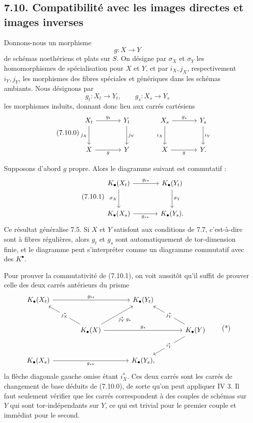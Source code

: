 \documentclass[11pt]{article}
\begin{document}
\subsection*{7.10. Compatibilité avec les images directes et images inverses}
Donnons-nous un morphisme
\[
  g:X\longrightarrow Y
\]
de schémas noethériens et plats sur \(S\). On désigne par \(\sigma_X\) et \(\sigma_Y\) les homomorphismes de spécialisation pour \(X\) et \(Y\), et par \(i_X,j_X\), respectivement \(i_Y,j_Y\), les morphismes des fibres spéciales et génériques dans les schémas ambiants. Nous désignons par
\[
  g_t:X_t\to Y_t,\qquad g_s:X_s\to Y_s
\]
les morphismes induits, donnant donc lieu aux carrés cartésiens
\begin{equation}\tag{7.10.0}
\begin{tikzcd}[column sep=large,row sep=large]
X_t \arrow[r,"g_t"] \arrow[d,"j_X"'] & Y_t \arrow[d,"j_Y"] &
X_s \arrow[r,"g_s"] \arrow[d,"i_X"'] & Y_s \arrow[d,"i_Y"]\\
X \arrow[r,"g"'] & Y &
X \arrow[r,"g"'] & Y .
\end{tikzcd}
\end{equation}

Supposons d'abord \(g\) propre. Alors le diagramme suivant est commutatif :
\begin{equation}\tag{7.10.1}
\begin{tikzcd}[column sep=large,row sep=large]
K_\bullet(X_t) \arrow[r,"g_{t*}"] \arrow[d,"\sigma_X"'] &
K_\bullet(Y_t) \arrow[d,"\sigma_Y"]\\
K_\bullet(X_s) \arrow[r,"g_{s*}"'] &
K_\bullet(Y_s).
\end{tikzcd}
\end{equation}
Ce résultat généralise 7.5. Si \(X\) et \(Y\) satisfont aux conditions de 7.7, c'est-à-dire sont à fibres régulières, alors \(g_t\) et \(g_s\) sont automatiquement de tor-dimension finie, et le diagramme peut s'interpréter comme un diagramme commutatif avec des \(K^\bullet\).

Pour prouver la commutativité de (7.10.1), on voit aussitôt qu'il suffit de prouver celle des deux carrés antérieurs du prisme
\[
\begin{tikzcd}[column sep=large,row sep=large]
K_\bullet(X_t) \arrow[rr,"g_{t*}"] && K_\bullet(Y_t)\\
& K_\bullet(X) \arrow[ur,"j_Y^*\,g_*"'] \arrow[ul,"j_X^*" description] \arrow[rr,"g_*"] &&
K_\bullet(Y) \arrow[ul,"j_Y^*" description] \arrow[dl,"i_Y^*" description]\\
K_\bullet(X_s) \arrow[rr,"g_{s*}"'] && K_\bullet(Y_s),
\end{tikzcd}
\tag{*}
\]
la flèche diagonale gauche omise étant \(i_X^*\). Ces deux carrés sont les carrés de changement de base déduits de (7.10.0), de sorte qu'on peut appliquer IV 3. Il faut seulement vérifier que les carrés correspondent à des couples de schémas sur \(Y\) qui sont tor-indépendants sur \(Y\), ce qui est trivial pour le premier couple et immédiat pour le second.
\end{document}
